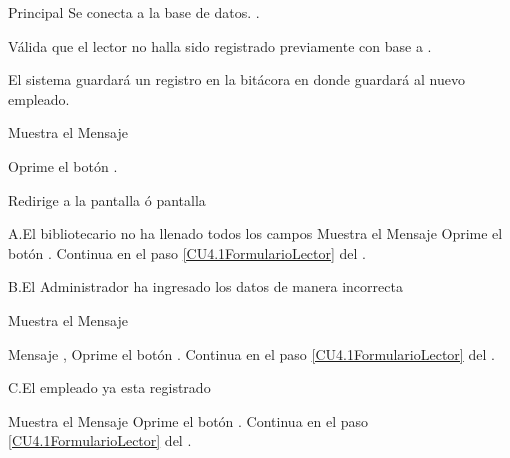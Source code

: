 \begin{UCtrayectoria}{Principal}
		\UCpaso Se conecta a la base de datos. .

		\UCpaso Válida que el lector no halla sido registrado previamente con base a  .

		\UCpaso El sistema guardará un registro en la bitácora en donde guardará al nuevo empleado.

		\UCpaso Muestra el Mensaje 

		\UCpaso[\UCactor] Oprime el botón .

		\UCpaso Redirige a la pantalla  ó pantalla 
		

	\end{UCtrayectoria}




		
		
		\begin{UCtrayectoriaA}{A.}{El bibliotecario no ha llenado todos los campos}
			\UCpaso Muestra el Mensaje 
			\UCpaso[\UCactor] Oprime el botón .
			\UCpaso Continua en el paso \ref{CU4.1FormularioLector} del .
			
		\end{UCtrayectoriaA}


		\begin{UCtrayectoriaA}{B.}{El Administrador ha ingresado los datos de manera incorrecta}

			\UCpaso Muestra el Mensaje \item Mensaje ,
			\UCpaso[\UCactor] Oprime el botón .
			\UCpaso Continua en el paso \ref{CU4.1FormularioLector} del .

		\end{UCtrayectoriaA}

		\begin{UCtrayectoriaA}{C.}{El empleado ya esta registrado}

			\UCpaso Muestra el Mensaje 
			\UCpaso[\UCactor] Oprime el botón .
			\UCpaso Continua en el paso \ref{CU4.1FormularioLector} del .

		\end{UCtrayectoriaA}

